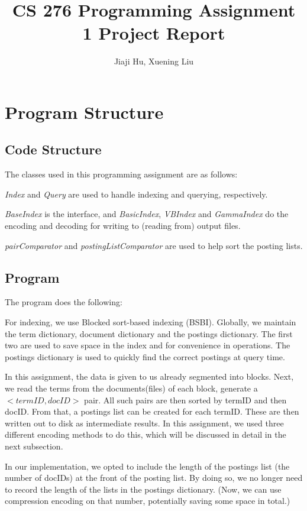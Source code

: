 \documentclass[10pt]{article}
\begin{document}
\title{CS 276 Programming Assignment 1 Project Report}
\author{Jiaji Hu, Xuening Liu}
\date{}
\maketitle

\section{Program Structure}
\subsection{Code Structure}
The classes used in this programming assignment are as follows:

{\it Index} and {\it Query} are used to handle indexing and querying, respectively.

{\it BaseIndex} is the interface, and {\it BasicIndex}, {\it VBIndex} and {\it GammaIndex} do the encoding and decoding for writing to (reading from) output files.

{\it pairComparator} and {\it postingListComparator} are used to help sort the posting lists.

\subsection{Program}
The program does the following:

For indexing, we use Blocked sort-based indexing (BSBI). Globally, we maintain the term dictionary, document dictionary and the postings dictionary. The first two are used to save space in the index and for convenience in operations. The postings dictionary is used to quickly find the correct postings at query time.

In this assignment, the data is given to us already segmented into blocks. Next, we read the terms from the documents(files) of each block, generate a $<termID,docID>$ pair. All such pairs are then sorted by termID and then docID. From that, a postings list can be created for each termID. These are then written out to disk as intermediate results. In this assignment, we used three different encoding methods to do this, which will be discussed in detail in the next subsection.

In our implementation, we opted to include the length of the postings list (the number of docIDs) at the front of the posting list. By doing so, we no longer need to record the length of the lists in the postings dictionary. (Now, we can use compression encoding on that number, potentially saving some space in total.)
\end{document}
